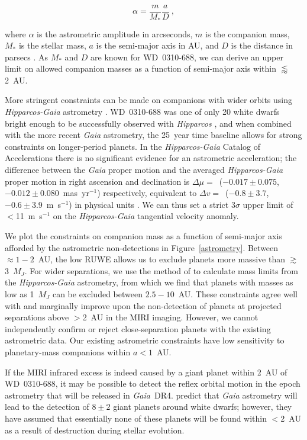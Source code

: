 \documentclass[twocolumn]{aastex631}
\begin{document}
\begin{equation}
    \alpha=\frac{m}{M_*}\frac{a}{D}
    \:,
\end{equation}

where $\alpha$ is the astrometric amplitude in arcseconds, $m$ is the companion mass, $M_*$ is the stellar mass, $a$ is the semi-major axis in AU, and $D$ is the distance in parsecs \citep{Sozzetti05}. As $M_*$ and $D$ are known for WD~0310-688, we can derive an upper limit on allowed companion masses as a function of semi-major axis within $\lessapprox$2~AU.

More stringent constraints can be made on companions with wider orbits using \textit{Hipparcos-Gaia} astrometry \citep{Brandt2018, Kervella2019}. WD~0310-688 was one of only 20 white dwarfs bright enough to be successfully observed with \textit{Hipparcos} \citep[HIP~14754;][]{Vauclair1997}, and when combined with the more recent \textit{Gaia} astrometry, the 25~year time baseline allows for strong constraints on longer-period planets. In the \textit{Hipparcos-Gaia} Catalog of Accelerations \citep[HGCA;][]{Brandt2021} there is no significant evidence for an astrometric acceleration; the difference between the \textit{Gaia} proper motion and the averaged \textit{Hipparcos-Gaia} proper motion in right ascension and declination is $\Delta\mu=$~($-0.017\pm0.075$, $-0.012\pm0.080$~mas~yr$^{-1}$) respectively, equivalent to $\Delta v=$~($-0.8\pm3.7$, $-0.6\pm3.9$~m~s$^{-1}$) in physical units \citep[][equations 9, 10]{Venner2021}. We can thus set a strict 3$\sigma$ upper limit of $<$11~m~s$^{-1}$ on the \textit{Hipparcos-Gaia} tangential velocity anomaly.

We plot the constraints on companion mass as a function of semi-major axis afforded by the astrometric non-detections in Figure~\ref{astrometry}. Between $\approx1-2$~AU, the low RUWE allows us to exclude planets more massive than $\gtrsim$3~$M_J$. For wider separations, we use the method of \citet{Kervella2019} to calculate mass limits from the \textit{Hipparcos-Gaia} astrometry, from which we find that planets with masses as low as 1~$M_J$ can be excluded between $2.5-10$~AU. These constraints agree well with and marginally improve upon the non-detection of planets at projected separations above $>$2~AU in the MIRI imaging. However, we cannot independently confirm or reject close-separation planets with the existing astrometric data. Our existing astrometric constraints have low sensitivity to planetary-mass companions within $a<1$~AU.

If the MIRI infrared excess is indeed caused by a giant planet within 2~AU of WD~0310-688, it may be possible to detect the reflex orbital motion in the epoch astrometry that will be released in \textit{Gaia}~DR4. \citep{Sanderson2022} predict that \textit{Gaia} astrometry will lead to the detection of $8\pm2$ giant planets around white dwarfs; however, they have assumed that essentially none of these planets will be found within $<$2~AU as a result of destruction during stellar evolution.
\end{document}
